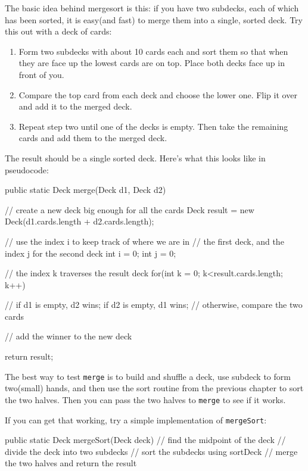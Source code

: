 \documentclass{book}
\begin{document}
The basic idea behind mergesort is this: if you have two subdecks,
each of which has been sorted, it is easy(and fast) to merge them
into a single, sorted deck.  Try this out with a deck of cards:

\begin{enumerate}

\item Form two subdecks with about 10 cards each and sort
them so that when they are face up the lowest cards are on
top.  Place both decks face up in front of you.

\item Compare the top card from each deck and choose the
lower one.  Flip it over and add it to the merged deck.

\item Repeat step two until one of the decks is empty.
Then take the remaining cards and add them to the merged
deck.

\end{enumerate}

The result should be a single sorted deck.  Here's what this
looks like in pseudocode:

\begin{verbatimtab}
public static Deck merge(Deck d1, Deck d2) {
    // create a new deck big enough for all the cards
    Deck result = new Deck(d1.cards.length + d2.cards.length);

    // use the index i to keep track of where we are in
    // the first deck, and the index j for the second deck
    int i = 0;
    int j = 0;
		
    // the index k traverses the result deck
    for(int k = 0; k<result.cards.length; k++) {
			
        // if d1 is empty, d2 wins; if d2 is empty, d1 wins;
        // otherwise, compare the two cards
			
        // add the winner to the new deck
    }
    return result;
}
\end{verbatimtab}

The best way to test {\tt merge} is to build and shuffle a deck,
use subdeck to form two(small) hands, and then use the sort
routine from the previous chapter to sort the two halves.  Then
you can pass the two halves to {\tt merge} to see if it works.


If you can get that working, try a simple implementation of
{\tt mergeSort}:

\begin{verbatimtab}
public static Deck mergeSort(Deck deck) {
    // find the midpoint of the deck
    // divide the deck into two subdecks
    // sort the subdecks using sortDeck
    // merge the two halves and return the result
}
\end{verbatimtab}
\end{document}

